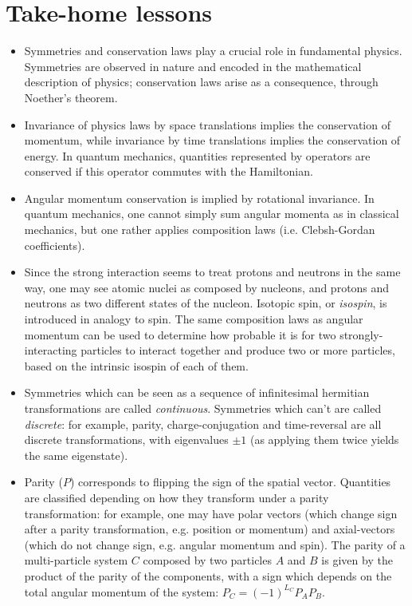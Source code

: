 \section*{Take-home lessons}
\begin{itemize}
    \item Symmetries and conservation laws play a crucial role in fundamental physics. Symmetries are observed in nature and encoded in the mathematical description of physics; conservation laws arise as a consequence, through Noether's theorem.
    \item Invariance of physics laws by space translations implies the conservation of momentum, while invariance by time translations implies the conservation of energy. In quantum mechanics, quantities represented by operators are conserved if this operator commutes with the Hamiltonian.
    \item Angular momentum conservation is implied by rotational invariance. In quantum mechanics, one cannot simply sum angular momenta as in classical mechanics, but one rather applies composition laws (i.e. Clebsh-Gordan coefficients).
    \item Since the strong interaction seems to treat protons and neutrons in the same way, one may see atomic nuclei as composed by nucleons, and protons and neutrons as two different states of the nucleon. Isotopic spin, or \emph{isospin}, is introduced in analogy to spin. The same composition laws as angular momentum can be used to determine how probable it is for two strongly-interacting particles to interact together and produce two or more  particles, based on the intrinsic isospin of each of them.
    \item Symmetries which can be seen as a sequence of infinitesimal hermitian transformations are called \emph{continuous}. Symmetries which can't are called \emph{discrete}: for example, parity, charge-conjugation and time-reversal are all discrete transformations, with eigenvalues $\pm1$ (as applying them twice yields the same eigenstate).
    \item Parity ($P$) corresponds to flipping the sign of the spatial vector. Quantities are classified depending on how they transform under a parity transformation: for example, one may have polar vectors (which change sign after a parity transformation, e.g. position or momentum) and axial-vectors (which do not change sign, e.g. angular momentum and spin). The parity of a multi-particle system $C$ composed by two particles $A$ and $B$ is given by the product of the parity of the components, with a sign which depends on the total angular momentum of the system: $P_C=(-1)^{L_C}P_A P_B$.

\end{itemize}
